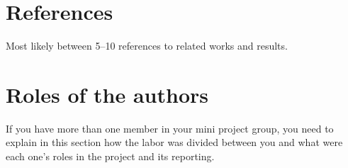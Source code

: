 \documentclass[a4paper,11pt]{article}
\begin{document}
\section{References}

Most likely between 5--10 references to related works and results.

\section{Roles of the authors}

If you have more than one member in your mini project group, you need
to explain in this section how the labor was divided between you and
what were each one's roles in the project and its reporting.
\end{document}
